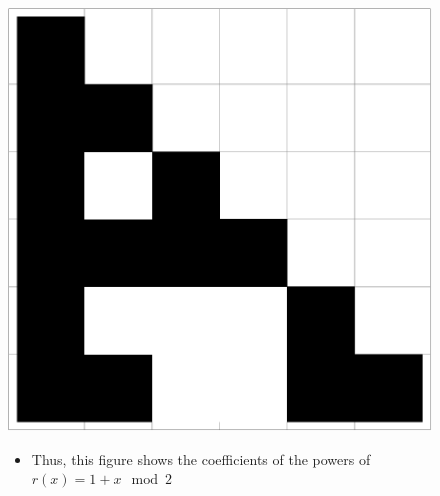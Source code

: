\documentclass{beamer}
\begin{document}
\begin{frame}
    \begin{figure}
        \centering
        \includegraphics[scale=0.4]{Mod2Poly.pdf}
        \begin{itemize}
            \item Thus, this figure shows the coefficients of the powers of $r(x) = 1+x \mod 2$ 
        \end{itemize}
    \end{figure}
\end{frame}
\end{document}
